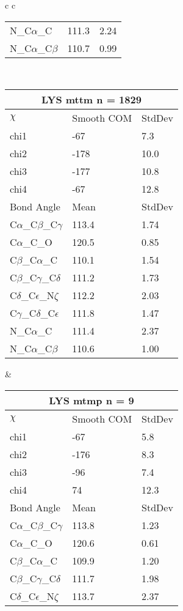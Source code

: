 \begin{longtable}{ c c }
\begin{tabular}{ l l l }
  N\_C$\alpha$\_C & 111.3 & 2.24\\
  N\_C$\alpha$\_C$\beta$ & 110.7 & 0.99\\
  \bottomrule
  \end{tabular}
  \\
  \begin{tabular}{ l l l }
  \toprule
  \multicolumn{3}{c}{LYS \textbf{mttm} n = 1829} \\ \toprule
  $\chi$       & Smooth COM & StdDev \\ \midrule
  chi1 & -67 & 7.3 \\ 
  chi2 & -178 & 10.0 \\ 
  chi3 & -177 & 10.8 \\ 
  chi4 & -67 & 12.8 \\ \midrule
  Bond Angle   & Mean     & StdDev \\ \midrule
  C$\alpha$\_C$\beta$\_C$\gamma$ & 113.4 & 1.74\\
  C$\alpha$\_C\_O & 120.5 & 0.85\\
  C$\beta$\_C$\alpha$\_C & 110.1 & 1.54\\
  C$\beta$\_C$\gamma$\_C$\delta$ & 111.2 & 1.73\\
  C$\delta$\_C$\epsilon$\_N$\zeta$ & 112.2 & 2.03\\
  C$\gamma$\_C$\delta$\_C$\epsilon$ & 111.8 & 1.47\\
  N\_C$\alpha$\_C & 111.4 & 2.37\\
  N\_C$\alpha$\_C$\beta$ & 110.6 & 1.00\\
  \bottomrule
  \end{tabular}
  &
  \begin{tabular}{ l l l }
  \toprule
  \multicolumn{3}{c}{LYS \textbf{mtmp} n = 9} \\ \toprule
  $\chi$       & Smooth COM & StdDev \\ \midrule
  chi1 & -67 & 5.8 \\ 
  chi2 & -176 & 8.3 \\ 
  chi3 & -96 & 7.4 \\ 
  chi4 & 74 & 12.3 \\ \midrule
  Bond Angle   & Mean     & StdDev \\ \midrule
  C$\alpha$\_C$\beta$\_C$\gamma$ & 113.8 & 1.23\\
  C$\alpha$\_C\_O & 120.6 & 0.61\\
  C$\beta$\_C$\alpha$\_C & 109.9 & 1.20\\
  C$\beta$\_C$\gamma$\_C$\delta$ & 111.7 & 1.98\\
  C$\delta$\_C$\epsilon$\_N$\zeta$ & 113.7 & 2.37\\

\end{tabular}
\end{longtable}
